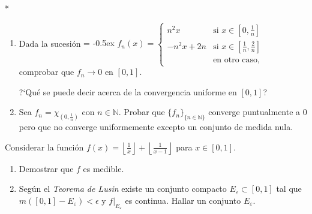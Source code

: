 \documentclass{book}
\newcommand{\nn}{\mathbb{N}}
\begin{document}
\begin{ejer} {}*
\begin{enumerate} 
\item Dada la sucesión
{
\extrarowheight = -0.5ex
\renewcommand{\arraystretch}{2.0}
$f_n(x)=\left\{
\begin{array}{cl}
n^2x &\mbox{si }x\in[0,\frac{1}{n}]
\\
-n^2x+2n &\mbox{si } x\in \left[\frac{1}{n},\frac{2}{n}\right] 
\\
&\mbox{en otro caso,}
\end{array}
\right.
$}\\
comprobar que $f_n \to 0$ en $[0,1]$. 

?`Qué se puede decir acerca de la convergencia uniforme en $[0,1]$?
\item Sea $f_n=\chi_{(0,\frac{1}{n})}$ con $n\in\nn$. 
Probar que $\{f_n\}_{\{n\in\nn\}}$ converge puntualmente a $0$ pero que no converge uniformemente
excepto un conjunto de medida nula.
\end{enumerate}
\end{ejer}

\begin{ejer}{}  
Considerar la funci\'on 
$f(x)=\left\lfloor \frac{1}{x}\right\rfloor+\left\lfloor \frac{1}{x-1}\right\rfloor$
para $x \in [0,1]$.
\begin{enumerate}
\item Demostrar que $f$ es medible.
\item Seg\'un el \textit{Teorema de Lusin} existe  un conjunto compacto $E_{\varepsilon}\subset [0,1]$
tal que $m\left([0,1]-E_{\varepsilon}\right)<\epsilon$ y $f\left.\right|_{E_{\varepsilon}}$ es continua.
Hallar un conjunto $E_{\varepsilon}$.
\end{enumerate}
\end{ejer}


\end{document}
